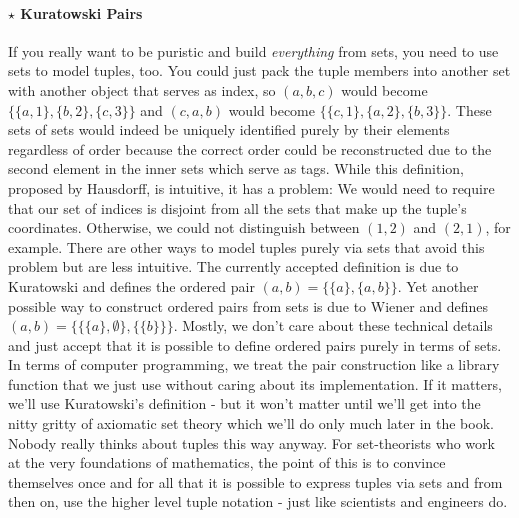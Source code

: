 \paragraph{$\star$ Kuratowski Pairs}
\label{Sec:KuratowskiPair}
\medskip
If you really want to be puristic and build \emph{everything} from sets, you need to use sets to model tuples, too. You could just pack the tuple members into another set with another object that serves as index, so $(a,b,c)$ would become $\{\{a,1\},\{b,2\},\{c,3\}\}$ and $(c,a,b)$ would become $\{\{c,1\},\{a,2\},\{b,3\}\}$. These sets of sets would indeed be uniquely identified purely by their elements regardless of order because the correct order could be reconstructed due to the second element in the inner sets which serve as tags. While this definition, proposed by Hausdorff, is intuitive, it has a problem: We would need to require that our set of indices is disjoint from all the sets that make up the tuple's coordinates. Otherwise, we could not distinguish between $(1,2)$ and $(2,1)$, for example. There are other ways to model tuples purely via sets that avoid this problem but are less intuitive. The currently accepted definition is due to Kuratowski and defines the ordered pair $(a,b) = \{ \{a\}, \{a,b\} \}$. Yet another possible way to construct ordered pairs from sets is due to Wiener and defines $(a,b) = \{ \{\{a\},\emptyset\}, \{\{b\}\} \}$. Mostly, we don't care about these technical details and just accept that it is possible to define ordered pairs purely in terms of sets. In terms of computer programming, we treat the pair construction like a library function that we just use without caring about its implementation. If it matters, we'll use Kuratowski's definition - but it won't matter until we'll get into the nitty gritty of axiomatic set theory which we'll do only much later in the book. Nobody really thinks about tuples this way anyway. For set-theorists who work at the very foundations of mathematics, the point of this is to convince themselves once and for all that it is possible to express tuples via sets and from then on, use the higher level tuple notation - just like scientists and engineers do. 








